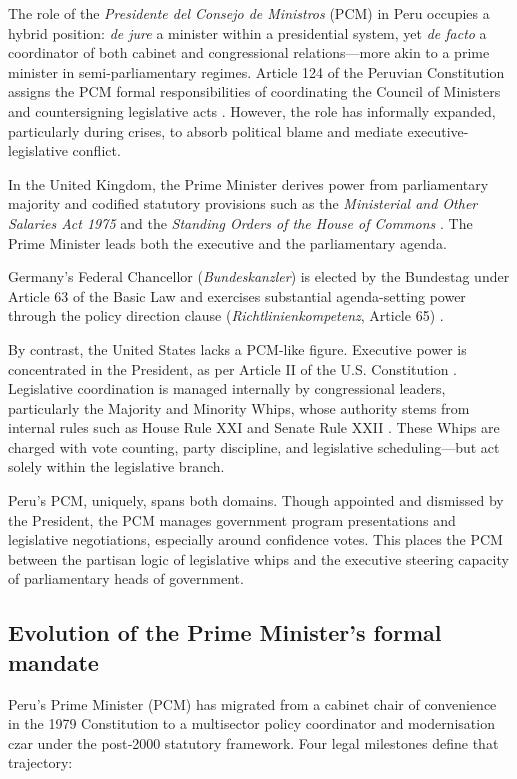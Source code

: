 \documentclass[a4paper, 12pt]{article}
\begin{document}
The role of the \textit{Presidente del Consejo de Ministros} (PCM) in Peru occupies a hybrid position: \textit{de jure} a minister within a presidential system, yet \textit{de facto} a coordinator of both cabinet and congressional relations—more akin to a prime minister in semi-parliamentary regimes. Article 124 of the Peruvian Constitution assigns the PCM formal responsibilities of coordinating the Council of Ministers and countersigning legislative acts \citep{republica_del_peru_constitucion_1993}. However, the role has informally expanded, particularly during crises, to absorb political blame and mediate executive-legislative conflict.

In the United Kingdom, the Prime Minister derives power from parliamentary majority and codified statutory provisions such as the \textit{Ministerial and Other Salaries Act 1975} \citep{united_kingdom_parliament_ministerial_1975} and the \textit{Standing Orders of the House of Commons} \citep{house_of_commons_standing_2024}. The Prime Minister leads both the executive and the parliamentary agenda.

Germany’s Federal Chancellor (\textit{Bundeskanzler}) is elected by the Bundestag under Article 63 of the Basic Law and exercises substantial agenda-setting power through the policy direction clause (\textit{Richtlinienkompetenz}, Article 65) \citep{federal_republic_of_germany_grundgesetz_1949}.

By contrast, the United States lacks a PCM-like figure. Executive power is concentrated in the President, as per Article II of the U.S. Constitution \citep{united_states_of_america_constitution_1787}. Legislative coordination is managed internally by congressional leaders, particularly the Majority and Minority Whips, whose authority stems from internal rules such as House Rule XXI and Senate Rule XXII \citep{us_house_of_representatives_rules_2023,us_senate_standing_2023}. These Whips are charged with vote counting, party discipline, and legislative scheduling—but act solely within the legislative branch.

Peru's PCM, uniquely, spans both domains. Though appointed and dismissed by the President, the PCM manages government program presentations and legislative negotiations, especially around confidence votes. This places the PCM between the partisan logic of legislative whips and the executive steering capacity of parliamentary heads of government.


\subsection{Evolution of the Prime Minister’s formal mandate} Peru’s Prime Minister (PCM) has migrated from a cabinet chair of convenience in the 1979 Constitution to a multisector policy coordinator and modernisation czar under the post‑2000 statutory framework.  Four legal milestones define that trajectory:
\end{document}
